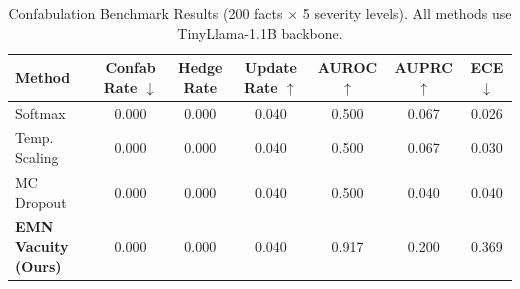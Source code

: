 \begin{table}[t]
\centering
\caption{Confabulation Benchmark Results (200 facts $\times$ 5 severity levels). All methods use TinyLlama-1.1B backbone.}
\label{tab:confabulation}
\begin{tabular}{lcccccc}
\toprule
Method & Confab Rate $\downarrow$ & Hedge Rate & Update Rate $\uparrow$ & AUROC $\uparrow$ & AUPRC $\uparrow$ & ECE $\downarrow$ \\
\midrule
Softmax & 0.000 & 0.000 & 0.040 & 0.500 & 0.067 & 0.026 \\
Temp. Scaling & 0.000 & 0.000 & 0.040 & 0.500 & 0.067 & 0.030 \\
MC Dropout & 0.000 & 0.000 & 0.040 & 0.500 & 0.040 & 0.040 \\
\textbf{EMN Vacuity (Ours)} & 0.000 & 0.000 & 0.040 & 0.917 & 0.200 & 0.369 \\
\bottomrule
\end{tabular}
\end{table}
